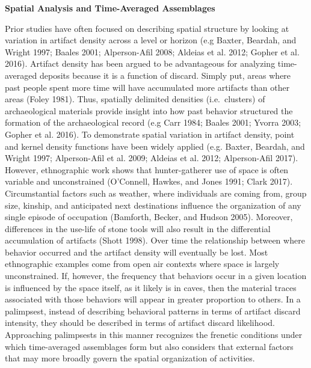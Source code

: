 \documentclass[smallextended]{svjour3}       %
\begin{document}
\textbf{Spatial Analysis and Time-Averaged Assemblages}

Prior studies have often focused on describing spatial structure by
looking at variation in artifact density across a level or horizon (e.g
Baxter, Beardah, and Wright 1997; Baales 2001; Alperson-Afil 2008;
Aldeias et al. 2012; Gopher et al. 2016). Artifact density has been
argued to be advantageous for analyzing time-averaged deposits because
it is a function of discard. Simply put, areas where past people spent
more time will have accumulated more artifacts than other areas (Foley
1981). Thus, spatially delimited densities (i.e.~clusters) of
archaeological materials provide insight into how past behavior
structured the formation of the archaeological record (e.g Carr 1984;
Baales 2001; Yvorra 2003; Gopher et al. 2016). To demonstrate spatial
variation in artifact density, point and kernel density functions have
been widely applied (e.g. Baxter, Beardah, and Wright 1997;
Alperson-Afil et al. 2009; Aldeias et al. 2012; Alperson-Afil 2017).
However, ethnographic work shows that hunter-gatherer use of space is
often variable and unconstrained (O'Connell, Hawkes, and Jones 1991;
Clark 2017). Circumstantial factors such as weather, where individuals
are coming from, group size, kinship, and anticipated next destinations
influence the organization of any single episode of occupation
(Bamforth, Becker, and Hudson 2005). Moreover, differences in the
use-life of stone tools will also result in the differential
accumulation of artifacts (Shott 1998). Over time the relationship
between where behavior occurred and the artifact density will eventually
be lost. Most ethnographic examples come from open air contexts where
space is largely unconstrained. If, however, the frequency that
behaviors occur in a given location is influenced by the space itself,
as it likely is in caves, then the material traces associated with those
behaviors will appear in greater proportion to others. In a palimpsest,
instead of describing behavioral patterns in terms of artifact discard
intensity, they should be described in terms of artifact discard
likelihood. Approaching palimpsests in this manner recognizes the
frenetic conditions under which time-averaged assemblages form but also
considers that external factors that may more broadly govern the spatial
organization of activities.
\end{document}
